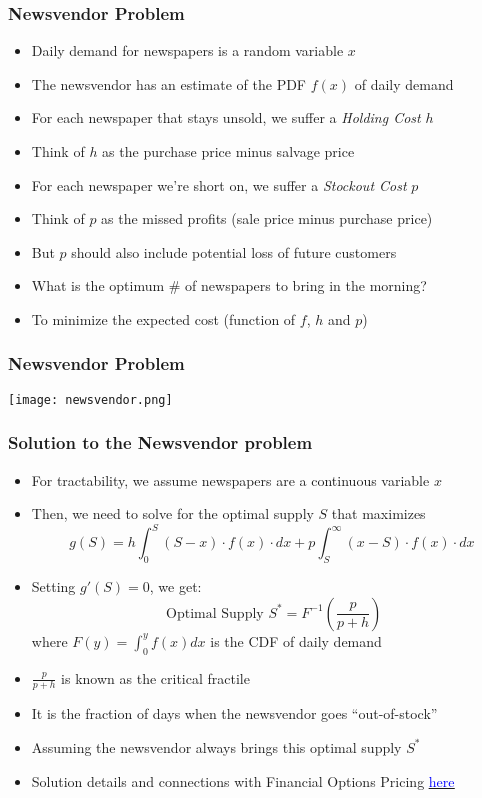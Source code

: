\documentclass[handout]{beamer}
\begin{document}
\begin{frame}
\frametitle{Newsvendor Problem}
\pause
\begin{itemize}[<+->]
\item Daily demand for newspapers is a random variable $x$
\item The newsvendor has an estimate of the PDF $f(x)$ of daily demand
\item For each newspaper that stays unsold, we suffer a {\em Holding Cost} $h$
\item Think of $h$ as the purchase price minus salvage price
\item For each newspaper we're short on, we suffer a {\em Stockout Cost} $p$
\item Think of $p$ as the missed profits (sale price minus purchase price)
\item But $p$ should also include potential loss of future customers
\item What is the optimum \# of newspapers to bring in the morning?
\item To minimize the expected cost (function of $f$, $h$ and $p$)
\end{itemize}
\end{frame}

\begin{frame}
\frametitle{Newsvendor Problem}
\texttt{[image: newsvendor.png]}
\end{frame}

\begin{frame}
\frametitle{Solution to the Newsvendor problem}
\pause
\begin{itemize}[<+->]
\item For tractability, we assume newspapers are a continuous variable $x$
\item Then, we need to solve for the optimal supply $S$ that maximizes
$$g(S) = h \int_0^S (S-x) \cdot f(x) \cdot dx + p \int_S^{\infty} (x-S) \cdot f(x) \cdot dx$$
\item Setting $g'(S) =0$, we get:
$$\mbox{ Optimal Supply } S^* = F^{-1}(\frac p {p+h})$$
where $F(y) = \int_0^y f(x) dx$ is the CDF of daily demand
\item $\frac p {p+h}$ is known as the critical fractile
\item It is the fraction of days when the newsvendor goes ``out-of-stock''
\item Assuming the newsvendor always brings this optimal supply $S^*$
\item Solution details and connections with Financial Options Pricing \href{https://github.com/coverdrive/technical-documents/blob/master/supply_chain/NewsvendorOptionsPricing/NewsvendorOptionsPricing.pdf}{\underline{\textcolor{blue}{here}}}
\end{itemize}
\end{frame}
\end{document}

